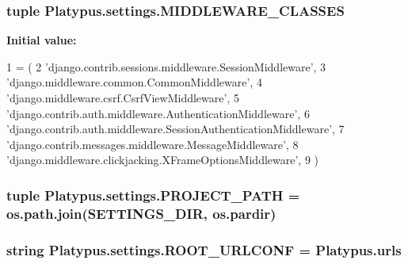 \subsubsection[{M\+I\+D\+D\+L\+E\+W\+A\+R\+E\+\_\+\+C\+L\+A\+S\+S\+E\+S}]{\setlength{\rightskip}{0pt plus 5cm}tuple Platypus.\+settings.\+M\+I\+D\+D\+L\+E\+W\+A\+R\+E\+\_\+\+C\+L\+A\+S\+S\+E\+S}\label{namespace_platypus_1_1settings_acb5170bcce1c81463df5170c9e53b4e3}
{\bfseries Initial value\+:}
\begin{DoxyCode}
1 = (
2     \textcolor{stringliteral}{'django.contrib.sessions.middleware.SessionMiddleware'},
3     \textcolor{stringliteral}{'django.middleware.common.CommonMiddleware'},
4     \textcolor{stringliteral}{'django.middleware.csrf.CsrfViewMiddleware'},
5     \textcolor{stringliteral}{'django.contrib.auth.middleware.AuthenticationMiddleware'},
6     \textcolor{stringliteral}{'django.contrib.auth.middleware.SessionAuthenticationMiddleware'},
7     \textcolor{stringliteral}{'django.contrib.messages.middleware.MessageMiddleware'},
8     \textcolor{stringliteral}{'django.middleware.clickjacking.XFrameOptionsMiddleware'},
9 )
\end{DoxyCode}
\subsubsection[{P\+R\+O\+J\+E\+C\+T\+\_\+\+P\+A\+T\+H}]{\setlength{\rightskip}{0pt plus 5cm}tuple Platypus.\+settings.\+P\+R\+O\+J\+E\+C\+T\+\_\+\+P\+A\+T\+H = os.\+path.\+join({\bf S\+E\+T\+T\+I\+N\+G\+S\+\_\+\+D\+I\+R}, os.\+pardir)}\label{namespace_platypus_1_1settings_abe93a21756340e9e7fdc8c80db00735e}
\subsubsection[{R\+O\+O\+T\+\_\+\+U\+R\+L\+C\+O\+N\+F}]{\setlength{\rightskip}{0pt plus 5cm}string Platypus.\+settings.\+R\+O\+O\+T\+\_\+\+U\+R\+L\+C\+O\+N\+F = \textquotesingle{}Platypus.\+urls\textquotesingle{}}\label{namespace_platypus_1_1settings_a79c6cca950bb10c5d935bcba5682eeee}
